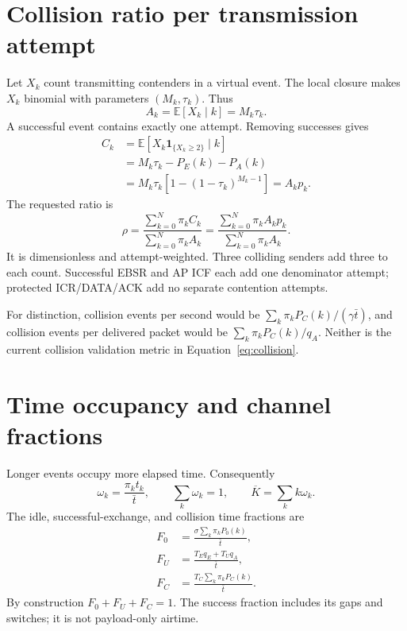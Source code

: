 \documentclass[11pt,a4paper]{article}
\newcommand{\ind}{\mathbf{1}}
\newcommand{\avg}[1]{\sum_{k=0}^{N}\pi_k #1}
\begin{document}
\section{Collision ratio per transmission attempt}
Let $X_k$ count transmitting contenders in a virtual event. The local
closure makes $X_k$ binomial with parameters $(M_k,\tau_k)$. Thus
\begin{equation}
A_k=\mathbb E[X_k\mid k]=M_k\tau_k.
\end{equation}
A successful event contains exactly one attempt. Removing successes gives
\begin{align}
C_k&=\mathbb E[X_k\ind_{\{X_k\geq2\}}\mid k]\\
&=M_k\tau_k-P_E(k)-P_A(k)\\
&=M_k\tau_k[1-(1-\tau_k)^{M_k-1}]=A_kp_k.
\end{align}
The requested ratio is
\begin{equation}\label{eq:collision}
\boxed{\rho=\frac{\avg{C_k}}{\avg{A_k}}
=\frac{\avg{A_kp_k}}{\avg{A_k}}}.
\end{equation}
It is dimensionless and attempt-weighted. Three colliding senders add three
to each count. Successful EBSR and AP ICF each add one denominator attempt;
protected ICR/DATA/ACK add no separate contention attempts.

For distinction, collision events per second would be
$\sum_k\pi_kP_C(k)/(\gamma\bar t)$, and collision events per delivered
packet would be $\sum_k\pi_kP_C(k)/q_A$. Neither is the current collision
validation metric in Equation~\eqref{eq:collision}.

\section{Time occupancy and channel fractions}
Longer events occupy more elapsed time. Consequently
\begin{equation}
\omega_k=\frac{\pi_kt_k}{\bar t},\qquad
\sum_k\omega_k=1,\qquad \overline K=\sum_k k\omega_k.
\end{equation}
The idle, successful-exchange, and collision time fractions are
\begin{align}
F_0&=\frac{\sigma\sum_k\pi_kP_0(k)}{\bar t},\\
F_U&=\frac{T_Eq_E+T_Uq_A}{\bar t},\\
F_C&=\frac{T_C\sum_k\pi_kP_C(k)}{\bar t}.
\end{align}
By construction $F_0+F_U+F_C=1$. The success fraction includes its gaps
and switches; it is not payload-only airtime.
\end{document}

